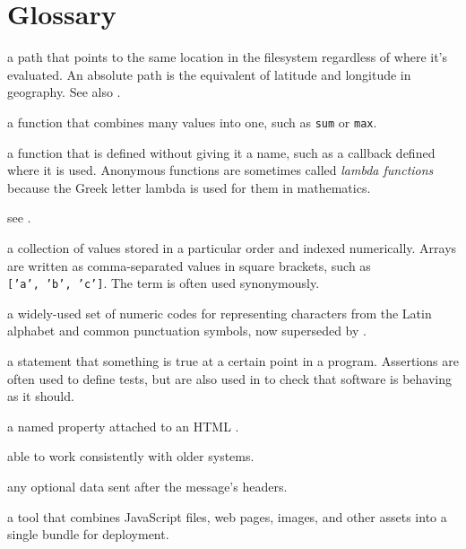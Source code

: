 \chapter{Glossary}\label{s:gloss}

\begin{description}

a path that points to the same location in the filesystem regardless of where
it's evaluated. An absolute path is the equivalent of latitude and longitude
in geography. See also .

a function that combines many values into one, such as \texttt{sum} or \texttt{max}.

a function that is defined without giving it a name, such as a callback
defined where it is used. Anonymous functions are sometimes called \emph{lambda
functions} because the Greek letter lambda is used for them in mathematics.

see .

a collection of values stored in a particular order and indexed numerically.
Arrays are written as comma-separated values in square brackets, such as
\texttt{{[}'a',\ 'b',\ 'c'{]}}. The term  is often used synonymously.

a widely-used set of numeric codes for representing characters from the Latin
alphabet and common punctuation symbols, now superseded by
.

a statement that something is true at a certain point in a program.
Assertions are often used to define tests, but are also used in  to check that software is behaving as it should.

a named property attached to an HTML .

able to work consistently with older systems.

any optional data sent after the message's headers.

a tool that combines JavaScript files, web pages, images, and other assets
into a single bundle for deployment.


\end{description}
